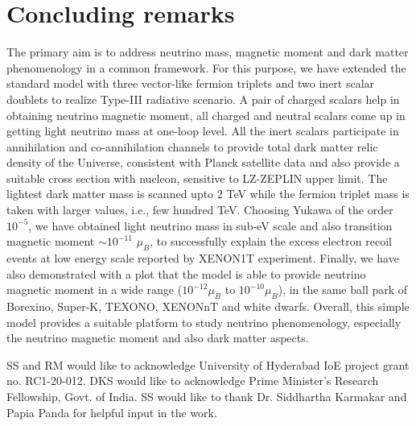 \documentclass[aps, a4paper,superscriptaddress,12pt,preprintnumbers,floatfix,nofootinbib,amsmath,amssymb]{revtex4}
\begin{document}
\section{Concluding remarks}
%
The primary aim is to address neutrino mass, magnetic moment and dark matter phenomenology in a common framework. For this purpose, we have extended the standard model with three vector-like fermion triplets and two inert scalar doublets to realize Type-III radiative scenario.  A pair of charged scalars help in obtaining neutrino magnetic moment, all charged and neutral scalars come up in getting light neutrino mass at one-loop level. All the inert scalars participate in annihilation and co-annihilation channels to provide total dark matter relic density of the Universe, consistent with Planck satellite data and also provide a suitable cross section with nucleon, sensitive to LZ-ZEPLIN upper limit. The lightest dark matter mass is scanned upto $2$ TeV while the fermion triplet mass is taken with larger values, i.e., few hundred TeV. Choosing Yukawa of the order $10^{-5}$, we have obtained light neutrino mass in sub-eV scale and also transition magnetic moment  $\sim 10^{-11}$ $\mu_B$, to  successfully explain the excess electron recoil events at low energy scale reported by XENON1T experiment. Finally, we have also demonstrated with a plot that the model is able to provide neutrino magnetic moment in a wide range ($10^{-12}\mu_B$ to $10^{-10}\mu_B$), in the same ball park of Borexino, Super-K, TEXONO, XENONnT and white dwarfs. Overall, this simple model provides a suitable platform to study neutrino phenomenology, especially the neutrino magnetic moment and also dark matter aspects.

\acknowledgments 
SS and RM would like to acknowledge University of Hyderabad IoE project grant no. RC1-20-012.  DKS would like to acknowledge Prime Minister's Research Fellowship, Govt. of India. SS would like to thank Dr. Siddhartha Karmakar and Papia Panda for helpful input in the work.




% 

\end{document}
